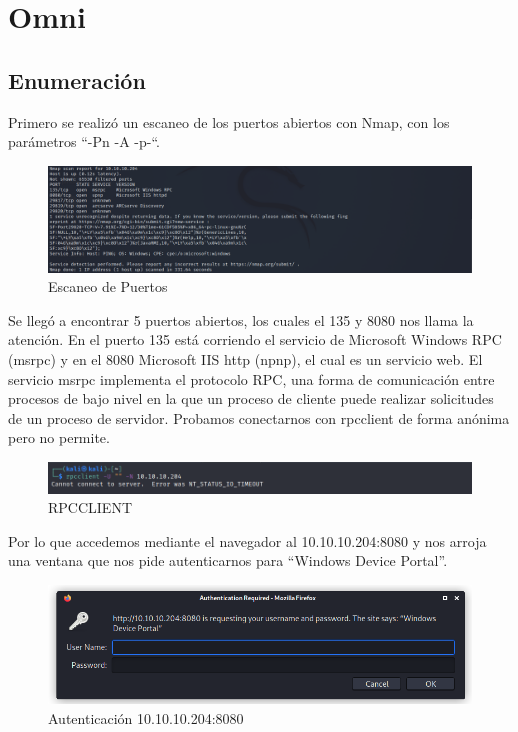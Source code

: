 \documentclass{article}
\begin{document}
\section{Omni}
\subsection{Enumeración}
Primero se realizó un escaneo de los puertos abiertos con Nmap, con los parámetros “-Pn -A -p-“.
\begin{figure}[H]
	\center
	\includegraphics[width=\textwidth]{images/omni/1.png}
	\caption{Escaneo de Puertos}
\end{figure}

Se llegó a encontrar 5 puertos abiertos, los cuales el 135 y 8080 nos llama la atención. En el puerto 135 está corriendo el servicio de Microsoft Windows RPC (msrpc) y en el 8080 Microsoft IIS http (npnp), el cual es un servicio web. El servicio msrpc implementa el protocolo RPC, una forma de comunicación entre procesos de bajo nivel en la que un proceso de cliente puede realizar solicitudes de un proceso de servidor.  Probamos conectarnos con rpcclient de forma anónima pero no permite.
\begin{figure}[H]
	\center
	\includegraphics[width=\textwidth]{images/omni/2.png}
	\caption{RPCCLIENT}
\end{figure}

Por lo que accedemos mediante el navegador al 10.10.10.204:8080 y nos arroja una ventana que nos pide autenticarnos para “Windows Device Portal”.
\begin{figure}[H]
	\center
	\includegraphics[width=\textwidth]{images/omni/3.png}
	\caption{Autenticación 10.10.10.204:8080}
\end{figure}
\end{document}
